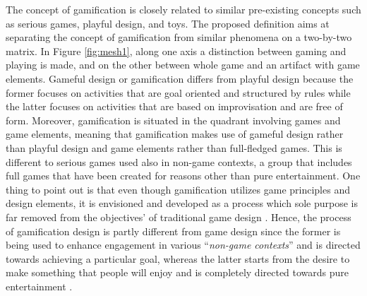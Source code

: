 The concept of gamification is closely related to similar pre-existing concepts such as serious games, playful design, and toys. The proposed definition aims at separating the concept of gamification from similar phenomena on a two-by-two matrix. In Figure \ref{fig:mesh1}, along one axis a distinction between gaming and playing is made, and on the other between whole game and an artifact with game elements. Gameful design or gamification differs from playful design because the former focuses on activities that are goal oriented and structured by rules while the latter focuses on activities that are based on improvisation and are free of form. Moreover, gamification is situated in the quadrant involving games and game elements, meaning that gamification makes use of gameful design rather than playful design and game elements rather than full-fledged games. This is different to serious games used also in non-game contexts, a group that includes full games that have been created for reasons other than pure entertainment. One thing to point out is that even though gamification utilizes game principles and design elements, it is envisioned  and developed as a process which sole purpose is far removed from the objectives' of traditional game design \cite{seaborn2015gamification}. Hence, the process of gamification design is partly different
from game design since the former is being used to enhance engagement in various ``\textit{non-game contexts}'' and is directed towards achieving a particular goal, whereas the latter starts from the desire to make something that people will enjoy and is completely directed towards pure entertainment \cite{seaborn2015gamification, gamifDesign}. 
